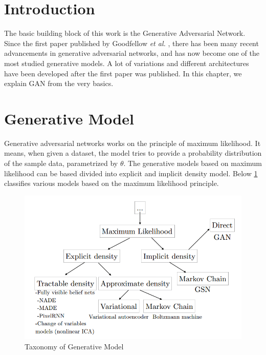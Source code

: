 
\doublespacing
{}
\label{chap:GAN}
\section{Introduction}

The basic building block of this work is the Generative Adversarial Network. Since the first paper published by Goodfellow \textit{et al.} \cite{Original-GAN}, there has been many recent advancements in generative adversarial networks, and has now become one of the most studied generative models. A lot of variations and different architectures have been developed after the first paper was published. In this chapter, we explain GAN from the very basics.

\section{Generative Model}
Generative adversarial networks works on the principle of maximum likelihood.
It means, when given a dataset, the model tries to provide a probability distribution of the sample data, parametrized by $\theta$. The generative models based on maximum likelihood can be based divided into explicit and implicit density model. Below \cref{fig: jordan} classifies various models based on the maximum likelihood principle.
%
\begin{figure}[ht]
    
    \includegraphics[scale=.6, angle=0]{Files/taxanomy.png}
    \caption[Taxonomy of Generative Model]{Taxonomy of Generative Model \cite{GanTut}}
    \label{fig: jordan}
\end{figure}

